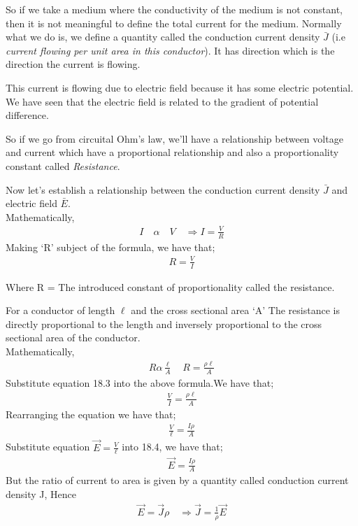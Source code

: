 So if we take a medium where the conductivity of the medium is not constant, then it is not meaningful to define the total current for the medium. Normally what we do is, we define a quantity called the conduction current density $ \bar{J} $ (i.e \emph{current flowing per unit area in this conductor}). It has direction which is the direction the current is flowing. 

This current is flowing due to electric field because it has some electric potential. We have seen that the electric field is related to the gradient of potential difference.

So if we go from circuital Ohm's law, we'll have a relationship between voltage and current which have a proportional relationship and also a proportionality constant called \emph{Resistance}.

Now let's establish a relationship between the conduction current density $ \bar{J} $ and electric field $ \bar{E} $. \\
Mathematically, 
\begin{align*}
I\quad\alpha\quad V \quad\Rightarrow I = \frac{V}{R}
\end{align*} 
Making `R' subject of the formula, we have that; 
\begin{align}
R =  \frac{V}{I} 
\end{align}
\begin{center}
Where R = The introduced constant of proportionality called the resistance.
\end{center}
For a conductor of length $\ell$ and the cross sectional area `A' The resistance is directly proportional to the length and inversely proportional to the cross sectional area of the conductor. \\
Mathematically, 
\begin{align*}
R \alpha \frac{\ell}{A}\quad R = \frac{\rho\ell}{A}
\end{align*}
Substitute equation 18.3 into the above formula.We have that;
\begin{align*}
\frac{V}{I} = \frac{\rho\ell}{A}
\end{align*}
Rearranging the equation we have that; 
\begin{align}
\frac{V}{\ell} = \frac{I\rho}{A}
\end{align}
Substitute equation $\vec{E} = \frac{V}{\ell}$ into 18.4, we have that;
\begin{align*}
\vec{E} = \frac{I\rho}{A}
\end{align*}
But the ratio of current to area is given by a quantity called conduction current density J, Hence
\begin{align*}
\vec{E} = \vec{J}\rho \quad \Rightarrow \vec{J}=\frac{1}{\rho}\vec{E}
\end{align*}

